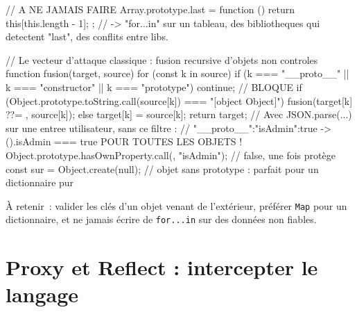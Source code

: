 \documentclass[12pt,a4paper,twoside,openright]{book}
\begin{document}
\begin{codejs}
// A NE JAMAIS FAIRE
Array.prototype.last = function () { return this[this.length - 1]; };
//   -> "for...in" sur un tableau, des bibliotheques qui detectent "last", des conflits entre libs.

// Le vecteur d'attaque classique : fusion recursive d'objets non controles
function fusion(target, source) {
  for (const k in source) {
    if (k === "__proto__" || k === "constructor" || k === "prototype") continue;   // BLOQUE
    if (Object.prototype.toString.call(source[k]) === "[object Object]") {
      fusion(target[k] ??= {}, source[k]);
    } else target[k] = source[k];
  }
  return target;
}
// Avec JSON.parse(...) sur une entree utilisateur, sans ce filtre :
//   {"__proto__":{"isAdmin":true}}   ->   ({}).isAdmin === true  POUR TOUTES LES OBJETS !
Object.prototype.hasOwnProperty.call({}, "isAdmin");     // false, une fois prot\`ege
const sur = Object.create(null);        // objet sans prototype : parfait pour un dictionnaire pur
\end{codejs}

\`A retenir~: valider les cl\'es d'un objet venant de l'ext\'erieur, pr\'ef\'erer \texttt{Map} pour
un dictionnaire, et ne jamais \'ecrire de \texttt{for...in} sur des donn\'ees non fiables.

\section{Proxy et Reflect : intercepter le langage}
\end{document}
